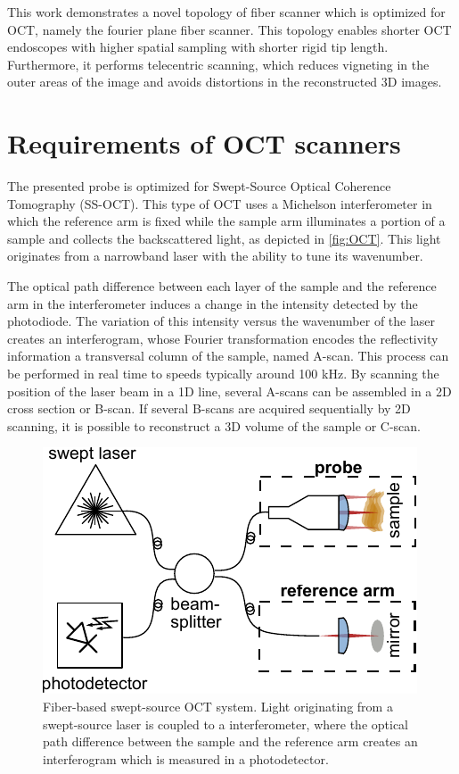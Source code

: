 \documentclass[10pt]{iopart}
\begin{document}
This work demonstrates a novel topology of fiber scanner which is optimized for OCT, namely the fourier plane fiber scanner. This topology enables shorter OCT endoscopes with higher spatial sampling with shorter rigid tip length. Furthermore, it performs telecentric scanning, which reduces vigneting in the outer areas of the image and avoids distortions in the reconstructed 3D images.


\section{Requirements of OCT scanners}

The presented probe is optimized for Swept-Source Optical Coherence Tomography (SS-OCT). This type of OCT uses a Michelson interferometer in which the reference arm is fixed while the sample arm illuminates a portion of a sample and collects the backscattered light, as depicted in \autoref{fig:OCT}. This light originates from a narrowband laser with the ability to tune its wavenumber. 


The optical path difference between each layer of the sample and the reference arm in the interferometer induces a change in the intensity detected by the photodiode. The variation of this intensity versus the wavenumber of the laser creates an interferogram, whose Fourier transformation encodes the reflectivity information a transversal column of the sample, named A-scan. This process can be performed in real time to speeds typically around 100 kHz. By scanning the position of the laser beam in a 1D line, several A-scans can be assembled in a 2D cross section or B-scan. If several B-scans are acquired sequentially by 2D scanning, it is possible to reconstruct a 3D volume of the sample or C-scan.

\begin{figure}[h!]\centering \includegraphics{figures/OCTsetup.pdf}
      \caption{Fiber-based swept-source OCT system. Light originating from a swept-source laser is coupled to a interferometer, where the optical path difference between the sample and the reference arm creates an interferogram which is measured in a photodetector.}
      \label{fig:OCT}
\end{figure}
\end{document}
